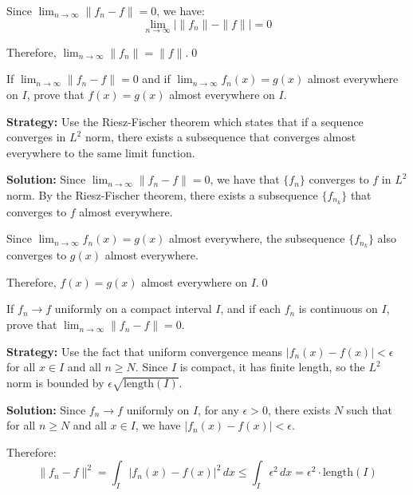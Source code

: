 Since $\lim_{n \to \infty} \| f_n - f \| = 0$, we have:
\[\lim_{n \to \infty} |\| f_n \| - \| f \|| = 0\]

Therefore, $\lim_{n \to \infty} \| f_n \| = \| f \|$.\qed


\begin{problembox}
\begin{problemstatement}
If $\lim_{n \to \infty} \| f_n - f \| = 0$ and if $\lim_{n \to \infty} f_n(x) = g(x)$ almost everywhere on $I$, prove that $f(x) = g(x)$ almost everywhere on $I$.
\end{problemstatement}
\end{problembox}

\noindent\textbf{Strategy:} Use the Riesz-Fischer theorem which states that if a sequence converges in $L^2$ norm, there exists a subsequence that converges almost everywhere to the same limit function.

\bigskip\noindent\textbf{Solution:}
Since $\lim_{n \to \infty} \| f_n - f \| = 0$, we have that $\{f_n\}$ converges to $f$ in $L^2$ norm. By the Riesz-Fischer theorem, there exists a subsequence $\{f_{n_k}\}$ that converges to $f$ almost everywhere.

Since $\lim_{n \to \infty} f_n(x) = g(x)$ almost everywhere, the subsequence $\{f_{n_k}\}$ also converges to $g(x)$ almost everywhere.

Therefore, $f(x) = g(x)$ almost everywhere on $I$.\qed


\begin{problembox}
\begin{problemstatement}
If $f_n \to f$ uniformly on a compact interval $I$, and if each $f_n$ is continuous on $I$, prove that $\lim_{n \to \infty} \| f_n - f \| = 0$.
\end{problemstatement}
\end{problembox}

\noindent\textbf{Strategy:} Use the fact that uniform convergence means $|f_n(x) - f(x)| < \epsilon$ for all $x \in I$ and all $n \geq N$. Since $I$ is compact, it has finite length, so the $L^2$ norm is bounded by $\epsilon \sqrt{\text{length}(I)}$.

\bigskip\noindent\textbf{Solution:}
Since $f_n \to f$ uniformly on $I$, for any $\epsilon > 0$, there exists $N$ such that for all $n \geq N$ and all $x \in I$, we have $|f_n(x) - f(x)| < \epsilon$.

Therefore:
\[\| f_n - f \|^2 = \int_I |f_n(x) - f(x)|^2 \, dx \leq \int_I \epsilon^2 \, dx = \epsilon^2 \cdot \text{length}(I)\]

